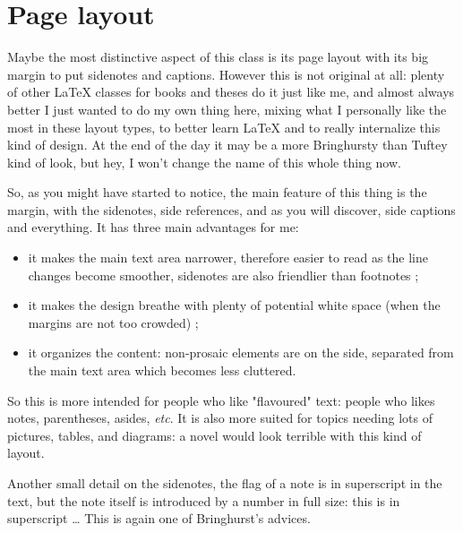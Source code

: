 \documentclass[
    11pt,
]{tufte-style-thesis}
\begin{document}
\section{Page layout}

Maybe the most distinctive aspect of this class is its page layout with its big margin to put sidenotes and captions. However this is not original at all: plenty of other \LaTeX{} classes for books and theses do it just like me, and almost always better I just wanted to do my own thing here, mixing what I personally like the most in these layout types, to better learn \LaTeX{} and to really internalize this kind of design. At the end of the day it may be a more Bringhursty than Tuftey kind of look, but hey, I won't change the name of this whole thing now.

So, as you might have started to notice, the main feature of this thing is the margin, with the sidenotes, side references, and as you will discover, side captions and everything. It has three main advantages for me:
\begin{itemize}
  \item it makes the main text area narrower, therefore easier to read as the line changes become smoother, sidenotes are also friendlier than footnotes ;
  \item it makes the design breathe with plenty of potential white space (when the margins are not too crowded) ;
  \item it organizes the content: non-prosaic elements are on the side, separated from the main text area which becomes less cluttered.
\end{itemize}
So this is more intended for people who like "flavoured" text: people who likes notes, parentheses, asides, \textit{etc}. It is also more suited for topics needing lots of pictures, tables, and diagrams: a novel would look terrible with this kind of layout.

Another small detail on the sidenotes, the flag of a note is in superscript in the text, but the note itself is introduced by a number in full size: this is in superscript \dots{} This is again one of Bringhurst's advices.
\end{document}
